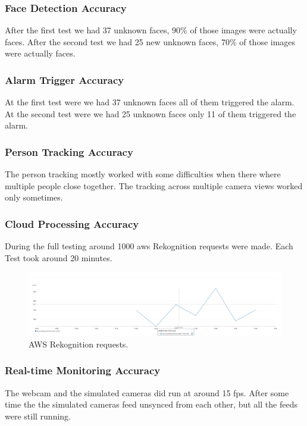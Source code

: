 \documentclass[conference]{IEEEtran}
\begin{document}
\subsubsection{Face Detection Accuracy}
After the first test we had 37 unknown faces, 90\% of those images were actually faces.
After the second test we had 25 new unknown faces, 70\% of those images were actually faces.\\

\subsubsection{Alarm Trigger Accuracy}
At the first test were we had 37 unknown faces all of them triggered the alarm.
At the second test were we had 25 unknown faces only 11 of them triggered the alarm.\\

\subsubsection{Person Tracking Accuracy}
The person tracking mostly worked with some difficulties when there where multiple people close together.
The tracking across multiple camera views worked only sometimes.

\subsubsection{Cloud Processing Accuracy}
During the full testing around 1000 aws Rekognition requests were made. Each Test took around 20 minutes.\\
\begin{figure}[ht]
      \centering
      \includegraphics[width=1\linewidth]{images/aws_rekognition.png}
      \caption{AWS Rekognition requests.}
      \label{fig:aws-rekognition}
\end{figure}

\subsubsection{Real-time Monitoring Accuracy}
The webcam and the simulated cameras did run at around 15 fps. After some time the the simulated cameras feed unsynced from each other, but 
all the feeds were still running.   
\end{document}
